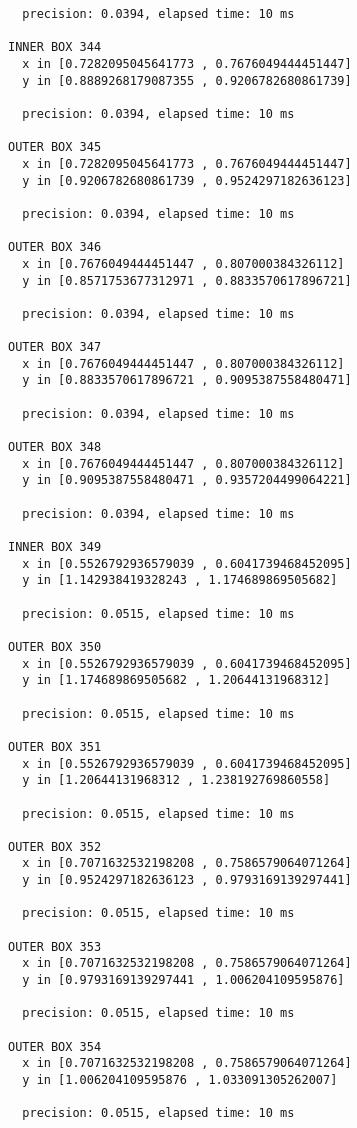 \begin{verbatim}
  precision: 0.0394, elapsed time: 10 ms

INNER BOX 344
  x in [0.7282095045641773 , 0.7676049444451447]
  y in [0.8889268179087355 , 0.9206782680861739]

  precision: 0.0394, elapsed time: 10 ms

OUTER BOX 345
  x in [0.7282095045641773 , 0.7676049444451447]
  y in [0.9206782680861739 , 0.9524297182636123]

  precision: 0.0394, elapsed time: 10 ms

OUTER BOX 346
  x in [0.7676049444451447 , 0.807000384326112]
  y in [0.8571753677312971 , 0.8833570617896721]

  precision: 0.0394, elapsed time: 10 ms

OUTER BOX 347
  x in [0.7676049444451447 , 0.807000384326112]
  y in [0.8833570617896721 , 0.9095387558480471]

  precision: 0.0394, elapsed time: 10 ms

OUTER BOX 348
  x in [0.7676049444451447 , 0.807000384326112]
  y in [0.9095387558480471 , 0.9357204499064221]

  precision: 0.0394, elapsed time: 10 ms

INNER BOX 349
  x in [0.5526792936579039 , 0.6041739468452095]
  y in [1.142938419328243 , 1.174689869505682]

  precision: 0.0515, elapsed time: 10 ms

OUTER BOX 350
  x in [0.5526792936579039 , 0.6041739468452095]
  y in [1.174689869505682 , 1.20644131968312]

  precision: 0.0515, elapsed time: 10 ms

OUTER BOX 351
  x in [0.5526792936579039 , 0.6041739468452095]
  y in [1.20644131968312 , 1.238192769860558]

  precision: 0.0515, elapsed time: 10 ms

OUTER BOX 352
  x in [0.7071632532198208 , 0.7586579064071264]
  y in [0.9524297182636123 , 0.9793169139297441]

  precision: 0.0515, elapsed time: 10 ms

OUTER BOX 353
  x in [0.7071632532198208 , 0.7586579064071264]
  y in [0.9793169139297441 , 1.006204109595876]

  precision: 0.0515, elapsed time: 10 ms

OUTER BOX 354
  x in [0.7071632532198208 , 0.7586579064071264]
  y in [1.006204109595876 , 1.033091305262007]

  precision: 0.0515, elapsed time: 10 ms


\end{verbatim}

